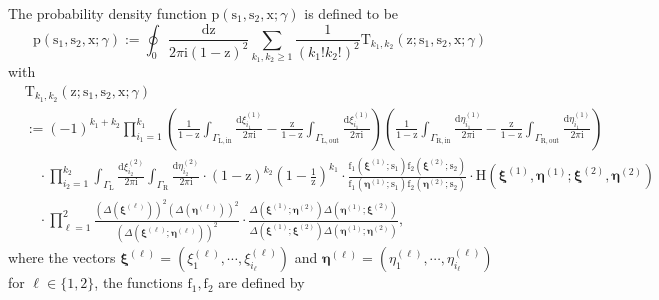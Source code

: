 \documentclass{article}
\numberwithin{equation}{section}
\newcommand{\ddbar}[2]{\frac{{\mathrm d}#1}{2\pi {\mathrm i}#2}}
\newcommand{\inn}{\mathrm{in}}
\newcommand{\limp}{\mathrm{p}}
\newcommand{\LL}{\mathrm{L}}
\newcommand{\out}{\mathrm{out}}
\newcommand{\RR}{\mathrm{R}}
\begin{document}
\bigskip

The probability density function $\limp(\mathrm{s}_1,\mathrm{s}_2,\mathrm{x};\gamma)$ is defined to be
\begin{equation}
	\label{eq:def_limiting_density}
	\limp(\mathrm{s}_1,\mathrm{s}_2,\mathrm{x};\gamma)
	:=\oint_0\ddbar{\mathrm{z}}{\mathrm{(1-z)^2}}\sum_{k_1,k_2\ge 1}
	\frac{1}{(k_1!k_2!)^2}
	\mathrm{T}_{k_1,k_2}(\mathrm{z};\mathrm{s}_1,\mathrm{s}_2,\mathrm{x};\gamma)
\end{equation}
with
\begin{equation}
	\label{eq:def_limit_T}
	\begin{split}
		&\mathrm{T}_{k_1,k_2}(\mathrm{z};\mathrm{s}_1,\mathrm{s}_2,\mathrm{x};\gamma)\\
		&:=(-1)^{k_1+k_2}
		\prod_{i_1=1}^{k_1}     
		\left(  \frac{1}{1-\mathrm{z}} \int_{\Gamma_{\LL,\inn}} 	    
		\ddbar{\xi^{(1)}_{i_1}}{}   
		-\frac{\mathrm{z}}{1-\mathrm{z}} \int_{\Gamma_{\LL,\out}} \ddbar{\xi^{(1)}_{i_1}}{}
		\right)
		\left(  \frac{1}{1-\mathrm{z}}  \int_{\Gamma_{\RR,\inn}}  
		\ddbar{\eta^{(1)}_{i_1}}{}
		-\frac{\mathrm{z}}{1-\mathrm{z}}   \int_{\Gamma_{\RR,\out}}
		\ddbar{\eta^{(1)}_{i_1}}{}
		\right)
		\\
		&\quad \cdot 
		\prod_{i_2=1}^{k_2}  
		\int_{\Gamma_\LL} \ddbar{\xi^{(2)}_{i_2}}{} 
		\int_{\Gamma_\RR} \ddbar{\eta^{(2)}_{i_2}}{} 
		\cdot    
		\left(1-\mathrm{z}\right)^{k_2}
		\left(1-\frac{1}{\mathrm{z}}\right)^{k_1}
		\cdot 
		\frac
		   {\mathrm{f}_1(\boldsymbol{\xi}^{(1)};\mathrm{s}_1)
			\mathrm{f}_2(\boldsymbol{\xi}^{(2)};\mathrm{s}_2)}
		   {\mathrm{f}_1(\boldsymbol{\eta}^{(1)};\mathrm{s}_1)
		   	\mathrm{f}_2(\boldsymbol{\eta}^{(2)};\mathrm{s}_2)}
		\cdot
		\mathrm{H}(\boldsymbol{\xi}^{(1)},\boldsymbol{\eta}^{(1)};
		           \boldsymbol{\xi}^{(2)},\boldsymbol{\eta}^{(2)})\\
		&\quad \cdot 
		\prod_{\ell=1}^2
		\frac{\left( \Delta(\boldsymbol{\xi}^{(\ell)}) \right)^2
			  \left( \Delta(\boldsymbol{\eta}^{(\ell)}) \right)^2
		     }
		     {\left( \Delta(\boldsymbol{\xi}^{(\ell)}; \boldsymbol{\eta}^{(\ell)}) \right)^2}
		\cdot 
		\frac{\Delta(\boldsymbol{\xi}^{(1)};\boldsymbol{\eta}^{(2)})
			  \Delta(\boldsymbol{\eta}^{(1)};\boldsymbol{\xi}^{(2)})
		     }
		     {\Delta(\boldsymbol{\xi}^{(1)};\boldsymbol{\xi}^{(2)})
		      \Delta(\boldsymbol{\eta}^{(1)};\boldsymbol{\eta}^{(2)})
	         },
	\end{split}
\end{equation}
where the vectors $\boldsymbol{\xi}^{(\ell)}=(\xi_1^{(\ell)},\cdots,\xi_{i_\ell}^{(\ell)})$ and $\boldsymbol{\eta}^{(\ell)}=(\eta_1^{(\ell)},\cdots,\eta^{(\ell)}_{i_\ell})$ for $\ell\in\{1,2\}$, the functions $\mathrm{f}_1,\mathrm{f}_2$ are defined by
\end{document}
